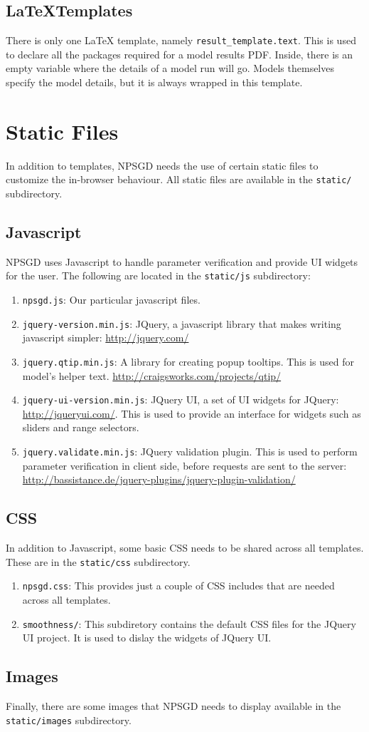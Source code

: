 \documentclass{article}
\newcommand{\mpath}[1]{\texttt{#1}}
\begin{document}
\subsection{\LaTeX Templates}
There is only one LaTeX template, namely \mpath{result\_template.text}. This is
used to declare all the packages required for a model results PDF. Inside, there
is an empty variable where the details of a model run will go. Models themselves
specify the model details, but it is always wrapped in this template.

\section{Static Files}
In addition to templates, NPSGD needs the use of certain static files to
customize the in-browser behaviour. All static files are available in the
\mpath{static/} subdirectory.

\subsection{Javascript}
NPSGD uses Javascript to handle parameter verification and provide UI
widgets for the user. The following are located in the \mpath{static/js}
subdirectory:
\begin{enumerate}
    \item \texttt{npsgd.js}: Our particular javascript files.
    \item \texttt{jquery-version.min.js}: JQuery, a javascript library that
    makes writing javascript simpler: \url{http://jquery.com/}
    \item \texttt{jquery.qtip.min.js}: A library for creating popup tooltips.
    This is used for model's helper text.
    \url{http://craigsworks.com/projects/qtip/}
    \item \texttt{jquery-ui-version.min.js}: JQuery UI, a set of UI widgets for
    JQuery: \url{http://jqueryui.com/}. This is used to provide an interface for 
    widgets such as sliders and range selectors.
    \item \texttt{jquery.validate.min.js}: JQuery validation plugin. This is
    used to perform parameter verification in client side, before requests are sent
    to the server:
    \url{http://bassistance.de/jquery-plugins/jquery-plugin-validation/}
\end{enumerate}

\subsection{CSS}
In addition to Javascript, some basic CSS needs to be shared across all
templates. These are in the \mpath{static/css} subdirectory.
\begin{enumerate}
    \item \texttt{npsgd.css}: This provides just a couple of CSS includes that
    are needed across all templates.
    \item \texttt{smoothness/}: This subdiretory contains the default CSS files
    for the JQuery UI project. It is used to dislay the widgets of JQuery UI.
\end{enumerate}

\subsection{Images}
Finally, there are some images that NPSGD needs to display available in the
\mpath{static/images} subdirectory. 
\end{document}
